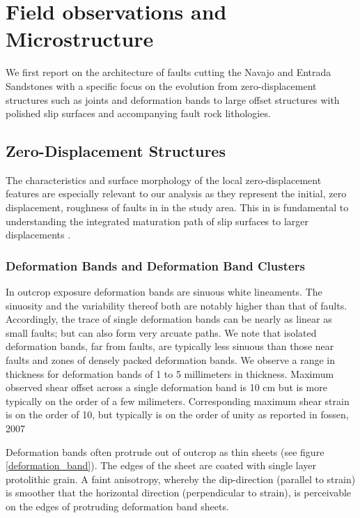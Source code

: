 \documentclass[12pt,a4paper]{article}
\begin{document}
\section{Field observations and Microstructure}

We first report on the architecture of faults cutting the Navajo and Entrada Sandstones with a specific focus on the evolution from zero-displacement structures such as joints and deformation bands to large offset structures with polished slip surfaces and accompanying fault rock lithologies.

\subsection{Zero-Displacement Structures}

The characteristics and surface morphology of the local zero-displacement features are especially relevant to our analysis as they represent the initial, zero displacement, roughness of faults in in the study area. This in is fundamental to understanding the integrated maturation path of slip surfaces to larger displacements \cite{power1988roughness}.

\subsubsection{Deformation Bands and Deformation Band Clusters}

In outcrop exposure deformation bands are sinuous white lineaments. The sinuosity and the variability thereof both are notably higher than that of faults. Accordingly, the trace of single deformation bands can be nearly as linear as small faults; but can also form very arcuate paths. We note that isolated deformation bands, far from faults, are typically less sinuous than those near faults and zones of densely packed deformation bands. We observe a range in thickness for deformation bands of 1 to 5 millimeters in thickness. Maximum observed shear offset across a single deformation band is 10 cm but is more typically on the order of a few milimeters. Corresponding maximum shear strain is on the order of 10, but typically is on the order of unity as reported in fossen, 2007

Deformation bands often protrude out of outcrop as thin sheets (see figure \ref{deformation_band}). The edges of the sheet are coated with single layer protolithic grain. A faint anisotropy, whereby the dip-direction (parallel to strain) is smoother that the horizontal direction (perpendicular to strain), is perceivable on the edges of protruding deformation band sheets. 
\end{document}
